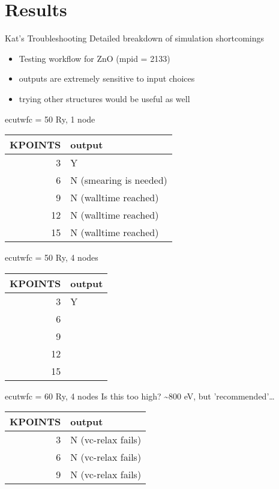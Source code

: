 \documentclass[8pt, compress]{beamer}
\begin{document}
\section{Results}
\label{sec:org17c9ad4}
\begin{frame}[allowframebreaks]{Kat's Troubleshooting}
Detailed breakdown of simulation shortcomings
\begin{itemize}
\item Testing workflow for ZnO (mpid = 2133)
\item outputs are \alert{extremely} sensitive to input choices
\item trying other structures would be useful as well
\end{itemize}
\begin{block}{ecutwfc = 50 Ry, 1 node}
\begin{center}
\begin{tabular}{rl}
KPOINTS & output\\
\hline
3 & Y\\
6 & N (smearing is needed)\\
9 & N (walltime reached)\\
12 & N (walltime reached)\\
15 & N (walltime reached)\\
\end{tabular}
\end{center}
\end{block}
\begin{block}{ecutwfc = 50 Ry, 4 nodes}
\begin{center}
\begin{tabular}{rl}
KPOINTS & output\\
\hline
3 & Y\\
6 & \\
9 & \\
12 & \\
15 & \\
\end{tabular}
\end{center}
\end{block}
\begin{block}{ecutwfc = 60 Ry, 4 nodes}
Is this too high? \textasciitilde{}800 eV, but 'recommended'\ldots{}
\begin{center}
\begin{tabular}{rl}
KPOINTS & output\\
\hline
3 & N (vc-relax fails)\\
6 & N (vc-relax fails)\\
9 & N (vc-relax fails)\\

\end{tabular}
\end{center}
\end{block}
\end{frame}
\end{document}
